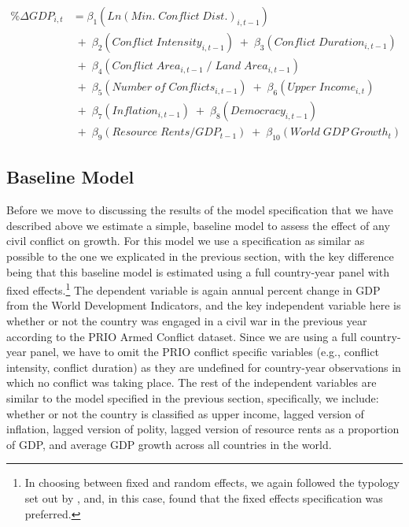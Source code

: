 \begin{align*}
	\% \Delta GDP_{i,t} &= \beta_{1}(Ln(Min. \; Conflict \; Dist.)_{i,t-1}) \\
	& \;+\; \beta_{2}(Conflict \; Intensity_{i,t-1}) \;+\; \beta_{3}(Conflict \; Duration_{i,t-1}) \\
	& \;+\; \beta_{4}(Conflict \; Area_{i,t-1} \;/\; Land \; Area_{i,t-1}) \\
	& \;+\; \beta_{5}(Number \; of \; Conflicts_{i,t-1}) \;+\; \beta_{6}(Upper \; Income_{i,t}) \\	
	& \;+\; \beta_{7}(Inflation_{i,t-1}) \;+\; \beta_{8}(Democracy_{i,t-1}) \\
	& \;+\; \beta_{9}(Resource \; Rents/GDP_{t-1}) \;+\; \beta_{10}(World \; GDP \; Growth_{t})
\end{align*}

\subsection{Baseline Model}

Before we move to discussing the results of the model specification that we have described above we estimate a simple, baseline model to assess the effect of any civil conflict on growth. For this model we use a specification as similar as possible to the one we explicated in the previous section, with the key difference being that this baseline model is estimated using a full country-year panel with fixed effects.\footnote{In choosing between fixed and random effects, we again followed the typology set out by \citet{clark:linzer:2015}, and, in this case, found that the fixed effects specification was preferred.} The dependent variable is again annual percent change in GDP from the World Development Indicators, and the key independent variable here is whether or not the country was engaged in a civil war in the previous year according to the PRIO Armed Conflict dataset. Since we are using a full country-year panel, we have to omit the PRIO conflict specific variables (e.g., conflict intensity, conflict duration) as they are undefined for country-year observations in which no conflict was taking place. The rest of the independent variables are similar to the model specified in the previous section, specifically, we include: whether or not the country is classified as upper income, lagged version of inflation, lagged version of polity, lagged version of resource rents as a proportion of GDP, and average GDP growth across all countries in the world. 

